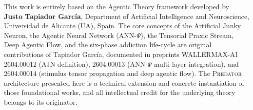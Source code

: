 \documentclass[12pt,a4paper]{article}
\newcommand{\PREDATOR}{\textsc{Predator}}
\begin{document}
This work is entirely based on the Agentic Theory framework developed by
\textbf{Justo Tapiador Garc\'ia}, Department of Artificial Intelligence
and Neuroscience, Universidad de Alicante (UA), Spain. The core concepts
of the Artificial Junky Neuron, the Agentic Neural Network (ANN-$\Psi$),
the Tensorial Praxic Stream, Deep Agentic Flow, and the six-phase addiction
life-cycle are original contributions of Tapiador Garc\'ia, documented
in preprints WALLERMAX-AI 2604.00012 (AJN definition), 2604.00013
(ANN-$\Psi$ multi-layer integration), and 2604.00014 (stimulus tensor
propagation and deep agentic flow). The \PREDATOR{} architecture presented
here is a technical extension and concrete instantiation of those foundational
works, and all intellectual credit for the underlying theory belongs to its
originator.

\newpage
\end{document}
